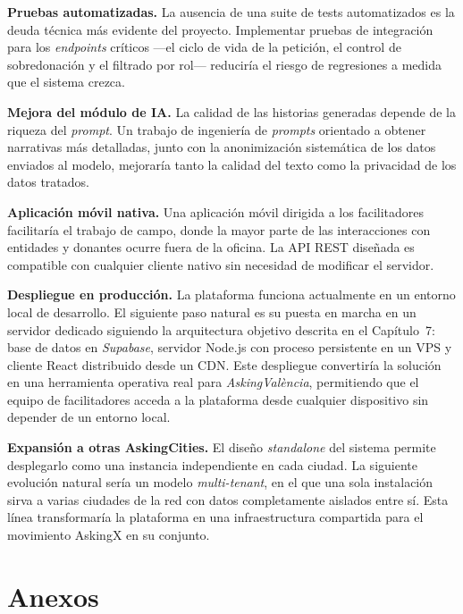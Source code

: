 \documentclass[11pt,oneside,spanish,listoffigures,listoftables]{tfgetsinf}
\begin{document}
\textbf{Pruebas automatizadas.} La ausencia de una suite de tests automatizados es la deuda técnica más evidente del proyecto. Implementar pruebas de integración para los \textit{endpoints} críticos —el ciclo de vida de la petición, el control de sobredonación y el filtrado por rol— reduciría el riesgo de regresiones a medida que el sistema crezca.

\textbf{Mejora del módulo de IA.} La calidad de las historias generadas depende de la riqueza del \textit{prompt}. Un trabajo de ingeniería de \textit{prompts} orientado a obtener narrativas más detalladas, junto con la anonimización sistemática de los datos enviados al modelo, mejoraría tanto la calidad del texto como la privacidad de los datos tratados.

\textbf{Aplicación móvil nativa.} Una aplicación móvil dirigida a los facilitadores facilitaría el trabajo de campo, donde la mayor parte de las interacciones con entidades y donantes ocurre fuera de la oficina. La API REST diseñada es compatible con cualquier cliente nativo sin necesidad de modificar el servidor.

\textbf{Despliegue en producción.} La plataforma funciona actualmente en un entorno local de desarrollo. El siguiente paso natural es su puesta en marcha en un servidor dedicado siguiendo la arquitectura objetivo descrita en el Capítulo~7: base de datos en \textit{Supabase}, servidor Node.js con proceso persistente en un VPS y cliente React distribuido desde un CDN. Este despliegue convertiría la solución en una herramienta operativa real para \textit{AskingValència}, permitiendo que el equipo de facilitadores acceda a la plataforma desde cualquier dispositivo sin depender de un entorno local.

\textbf{Expansión a otras AskingCities.} El diseño \textit{standalone} del sistema permite desplegarlo como una instancia independiente en cada ciudad. La siguiente evolución natural sería un modelo \textit{multi-tenant}, en el que una sola instalación sirva a varias ciudades de la red con datos completamente aislados entre sí. Esta línea transformaría la plataforma en una infraestructura compartida para el movimiento AskingX en su conjunto.




\cleardoublepage

\chapter{Anexos}
\end{document}
